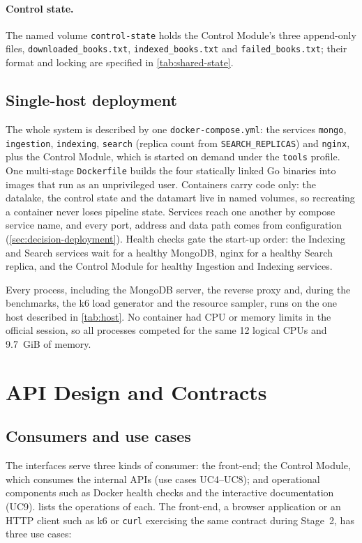 \documentclass[10pt,a4paper]{article}
\newcommand{\code}[1]{\texttt{#1}}
\begin{document}
\paragraph{Control state.}
The named volume \code{control-state} holds the Control Module's three
append-only files, \code{downloaded\_books.txt}, \code{indexed\_books.txt} and
\code{failed\_books.txt}; their format and locking are specified in
\cref{tab:shared-state}.

\subsection{Single-host deployment}
\label{sec:deployment}

The whole system is described by one \code{docker-compose.yml}: the services
\code{mongo}, \code{ingestion}, \code{indexing}, \code{search} (replica count
from \code{SEARCH\_REPLICAS}) and \code{nginx}, plus the Control Module, which
is started on demand under the \code{tools} profile. One multi-stage
\code{Dockerfile} builds the four statically linked Go binaries into images
that run as an unprivileged user. Containers carry code only: the datalake,
the control state and the datamart live in named volumes, so recreating a
container never loses pipeline state. Services reach one another by compose
service name, and every port, address and data path comes from configuration
(\cref{sec:decision-deployment}). Health checks gate the start-up order: the
Indexing and Search services wait for a healthy MongoDB, nginx for a healthy
Search replica, and the Control Module for healthy Ingestion and Indexing
services.

Every process, including the MongoDB server, the reverse proxy and, during
the benchmarks, the k6 load generator and the resource sampler, runs on the
one host described in \cref{tab:host}. No container had CPU or memory limits in
the official session, so all processes competed for the same 12 logical CPUs
and 9.7~GiB of memory.

\section{API Design and Contracts}
\label{sec:api}

\subsection{Consumers and use cases}
\label{sec:use-cases}

The interfaces serve three kinds of consumer: the front-end; the Control
Module, which consumes the internal APIs (use cases UC4--UC8); and operational
components such as Docker health checks and the interactive documentation
(UC9).  lists the operations of each. The front-end, a
browser application or an HTTP client such as k6 or \code{curl} exercising the
same contract during Stage~2, has three use cases:
\end{document}
